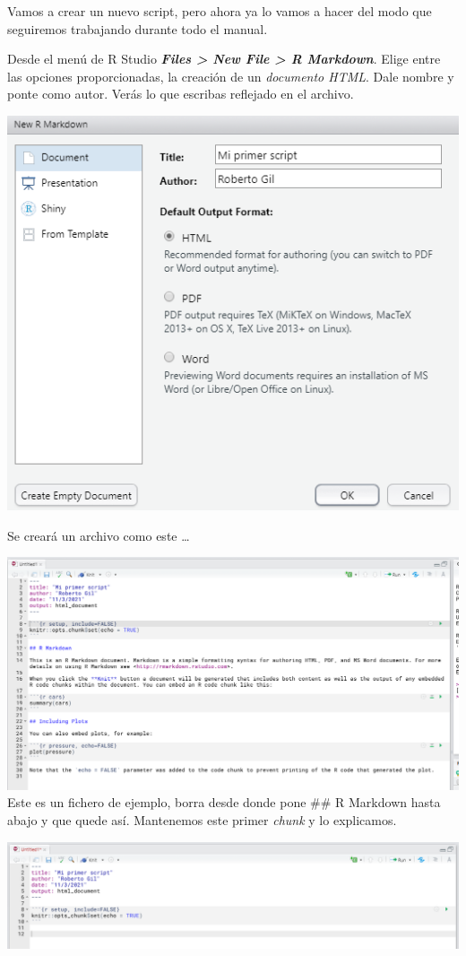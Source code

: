 \documentclass[
]{book}
\begin{document}
Vamos a crear un nuevo script, pero ahora ya lo vamos a hacer del modo que seguiremos trabajando durante todo el manual.

Desde el menú de R Studio \textbf{\emph{Files \textgreater{} New File \textgreater{} R Markdown}}. Elige entre las opciones proporcionadas, la creación de un \emph{documento HTML}. Dale nombre y ponte como autor. Verás lo que escribas reflejado en el archivo.

\includegraphics{data/RS07.png}

Se creará un archivo como este \ldots{}

\includegraphics{data/RS08.png}
Este es un fichero de ejemplo, borra desde donde pone \#\# R Markdown hasta abajo y que quede así. Mantenemos este primer \emph{chunk} y lo explicamos.

\includegraphics{data/RS09.png}
\end{document}
